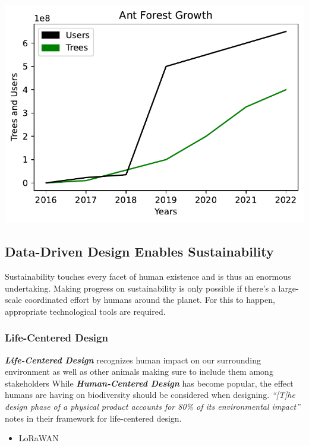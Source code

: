 \documentclass[
  letterpaper,
  DIV=11,
  numbers=noendperiod]{scrartcl}
\providecommand{\tightlist}{%
  \setlength{\itemsep}{0pt}\setlength{\parskip}{0pt}}\usepackage{longtable,booktabs,array}
\begin{document}
\includegraphics{_thesis_files/figure-pdf/cell-4-output-1.pdf}

\subsection{Data-Driven Design Enables
Sustainability}\label{data-driven-design-enables-sustainability}

Sustainability touches every facet of human existence and is thus an
enormous undertaking. Making progress on sustainability is only possible
if there's a large-scale coordinated effort by humans around the planet.
For this to happen, appropriate technological tools are required.

\subsubsection{Life-Centered Design}\label{life-centered-design}

\textbf{\emph{Life-Centered Design}} recognizes human impact on our
surrounding environment as well as other animals making sure to include
them among stakeholders While \textbf{\emph{Human-Centered Design}} has
become popular, the effect humans are having on biodiversity should be
considered when designing. \emph{``{[}T{]}he design phase of a physical
product accounts for 80\% of its environmental impact''}
notes\citep{borthwickHumancentredLifecentredDesign2022} in their
framework for life-centered design.

\begin{itemize}
\tightlist
\item
  \citet{sanchezGreenBearLoRaWANbased2022} LoRaWAN
\end{itemize}
\end{document}
